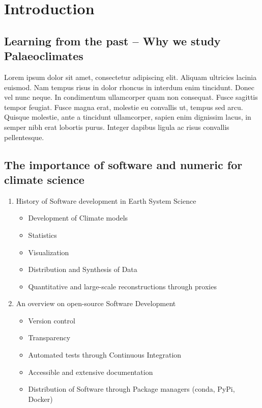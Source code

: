 
\chapter{Introduction} 

\label{chp:intro}


\section{Learning from the past – Why we study Palaeoclimates} \label{sec:intro-palaeo}

Lorem ipsum dolor sit amet, consectetur adipiscing elit. Aliquam ultricies lacinia euismod. Nam tempus risus in dolor rhoncus in interdum enim tincidunt. Donec vel nunc neque. In condimentum ullamcorper quam non consequat. Fusce sagittis tempor feugiat. Fusce magna erat, molestie eu convallis ut, tempus sed arcu. Quisque molestie, ante a tincidunt ullamcorper, sapien enim dignissim lacus, in semper nibh erat lobortis purus. Integer dapibus ligula ac risus convallis pellentesque.



\section{The importance of software and numeric for climate science} \label{sec:intro-software}

\begin{enumerate}
	\item History of Software development in Earth System Science
		\begin{itemize}
			\item Development of Climate models
			\item Statistics
			\item Visualization
			\item Distribution and Synthesis of Data
			\item Quantitative and large-scale reconstructions through proxies
		\end{itemize}
	\item An overview on open-source Software Development
		\begin{itemize}
			\item
			Version control
			\item
			Transparency
			\item
			Automated tests through Continuous Integration
			\item
			Accessible and extensive documentation
			\item
			Distribution of Software through Package managers (conda, PyPi,
			Docker)
		\end{itemize}
\end{enumerate}


